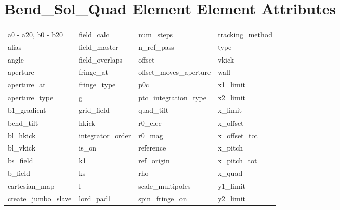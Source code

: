 \section{Bend_Sol_Quad Element Element Attributes}
 \label{s:list.bend.sol.quad}
 
 \begin{tabular}{llll} \toprule
a0 - a20, b0 - b20          & field_calc                  & num_steps                   & tracking_method             \\
alias                       & field_master                & n_ref_pass                  & type                        \\
angle                       & field_overlaps              & offset                      & vkick                       \\
aperture                    & fringe_at                   & offset_moves_aperture       & wall                        \\
aperture_at                 & fringe_type                 & p0c                         & x1_limit                    \\
aperture_type               & g                           & ptc_integration_type        & x2_limit                    \\
b1_gradient                 & grid_field                  & quad_tilt                   & x_limit                     \\
bend_tilt                   & hkick                       & r0_elec                     & x_offset                    \\
bl_hkick                    & integrator_order            & r0_mag                      & x_offset_tot                \\
bl_vkick                    & is_on                       & reference                   & x_pitch                     \\
bs_field                    & k1                          & ref_origin                  & x_pitch_tot                 \\
b_field                     & ks                          & rho                         & x_quad                      \\
cartesian_map               & l                           & scale_multipoles            & y1_limit                    \\
create_jumbo_slave          & lord_pad1                   & spin_fringe_on              & y2_limit                    \\

\end{tabular}
